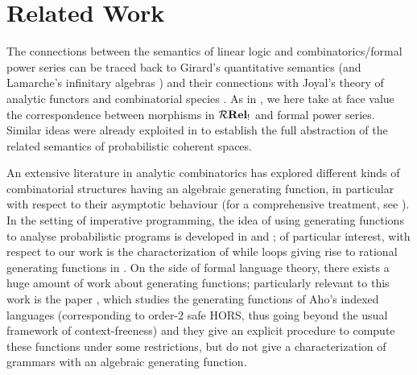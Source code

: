 \section{Related Work}



The connections between the semantics of linear logic and combinatorics/formal power series can be traced back to Girard's
quantitative semantics \cite{GIRARD1988129} (and Lamarche's infinitary algebras \cite{LAMARCHE199237}) and their connections with Joyal's theory of analytic functors and combinatorial species \cite{JOYAL19811}. 
As in \cite{DBLP:journals/corr/abs-2501-15637}, we here take at face value the correspondence between morphisms in $\mathcal{R}\mathbf{Rel_!}$ and formal power series. Similar ideas were already exploited in \cite{DBLP:journals/jacm/EhrhardPT18} to establish the full abstraction of the related semantics of probabilistic coherent spaces.

%
% 

An extensive literature in analytic combinatorics has explored different kinds of combinatorial structures having an algebraic generating function, in particular with respect to their asymptotic behaviour (for a comprehensive treatment, see \cite{DBLP:books/daglib/0023751}).
In the setting of imperative programming, the idea of using generating functions to analyse probabilistic programs is developed in \cite{Klinkenberg2021} and \cite{Klinkenberg2024}; 
of particular interest, with respect to our work is the characterization of while loops giving rise to rational generating functions in \cite{Klinkenberg2021}.
On the side of formal language theory, there exists a huge amount of work about generating functions; particularly relevant to this work is the paper \cite{DBLP:journals/ita/AdamsFM13},  which studies the generating functions of Aho's indexed languages (corresponding to order-2 safe HORS, thus going beyond the usual framework of context-freeness) and they give an explicit procedure to compute these functions under some restrictions, but do not give a characterization of grammars with an algebraic generating function.

